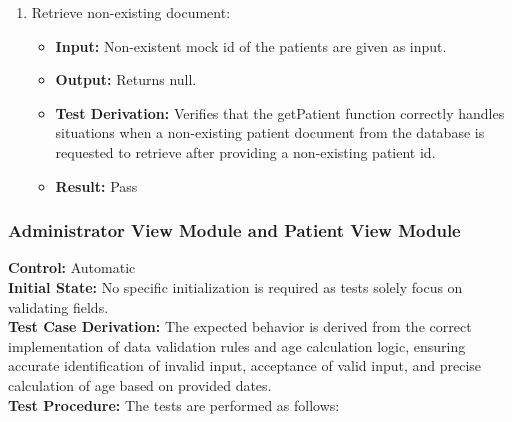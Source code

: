 \documentclass[12pt, titlepage]{article}
\begin{document}
\begin{enumerate}
    \item Retrieve non-existing document:
      \begin{itemize}
        \item \textbf{Input:} Non-existent mock id of the patients are given as input.  
        \item \textbf{Output:} Returns null. 
        \item \textbf{Test Derivation:} Verifies that the getPatient function correctly handles situations when a non-existing patient document from the database is requested to retrieve after providing a non-existing patient id.
        \item \textbf{Result:} Pass
      \end{itemize}
  \end{enumerate}

\subsubsection{Administrator View Module and Patient View Module}

  \textbf{Control:} Automatic\\
  \textbf{Initial State:} No specific initialization is required as tests solely focus on validating fields.\\
  \textbf{Test Case Derivation:} The expected behavior is derived from the correct implementation of data validation rules and age calculation logic, ensuring accurate identification of invalid input, acceptance of valid input, and precise calculation of age based on provided dates.\\
  \textbf{Test Procedure:} The tests are performed as follows:\\
\end{document}

